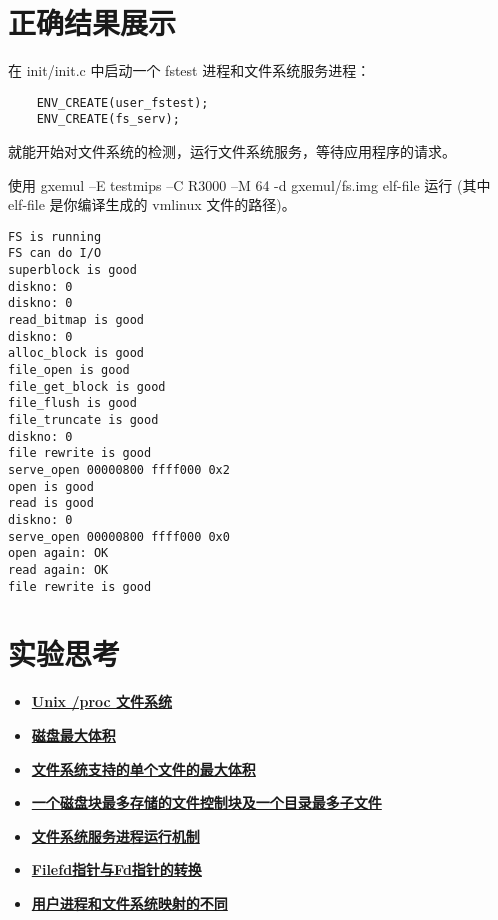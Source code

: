 %
%


\section{正确结果展示}

在 init/init.c 中启动一个 fstest 进程和文件系统服务进程：

\begin{verbatim}
    ENV_CREATE(user_fstest);
    ENV_CREATE(fs_serv);
\end{verbatim}

就能开始对文件系统的检测，运行文件系统服务，等待应用程序的请求。

\begin{note}
使用 gxemul –E testmips –C R3000 –M 64 -d gxemul/fs.img elf-file 运行 (其中 elf-file 是你编译生成的 vmlinux 文件的路径)。 
\end{note}

\begin{verbatim}
FS is running
FS can do I/O
superblock is good
diskno: 0
diskno: 0
read_bitmap is good
diskno: 0
alloc_block is good
file_open is good
file_get_block is good
file_flush is good
file_truncate is good
diskno: 0
file rewrite is good
serve_open 00000800 ffff000 0x2
open is good
read is good
diskno: 0
serve_open 00000800 ffff000 0x0
open again: OK
read again: OK
file rewrite is good
\end{verbatim}

\section{实验思考}

\begin{itemize}
\item \hyperref[think-proc]{\textbf{\textcolor{baseB}{Unix /proc 文件系统}}}
\item \hyperref[think-disksize]{\textbf{\textcolor{baseB}{磁盘最大体积}}}
\item \hyperref[think-filesize]{\textbf{\textcolor{baseB}{文件系统支持的单个文件的最大体积}}}
\item \hyperref[think-filenum]{\textbf{\textcolor{baseB}{一个磁盘块最多存储的文件控制块及一个目录最多子文件}}}
\item \hyperref[think-fs-serve]{\textbf{\textcolor{baseB}{文件系统服务进程运行机制}}}
\item \hyperref[think-Filefd-Fd]{\textbf{\textcolor{baseB}{Filefd指针与Fd指针的转换}}}
\item \hyperref[think-fileid]{\textbf{\textcolor{baseB}{用户进程和文件系统映射的不同}}}
\end{itemize}



